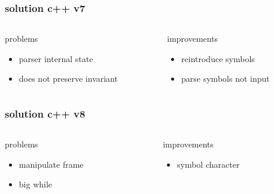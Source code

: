 \begin{frame}
    \frametitle{solution c++ v7}
    \begin{columns}
        \begin{column}{.48\textwidth}
            problems
            \begin{itemize}
                \item parser internal state
                \item does not preserve invariant
            \end{itemize}
        \end{column}
        \begin{column}{.48\textwidth}
            improvements
            \begin{itemize}
                \item reintroduce symbols
                \item parse symbols not input
            \end{itemize}
        \end{column}
    \end{columns}
\end{frame}

\begin{frame}
    \frametitle{solution c++ v8}
    \begin{columns}
        \begin{column}{.48\textwidth}
            problems
            \begin{itemize}
                \item manipulate frame
                \item big while
            \end{itemize}
        \end{column}
        \begin{column}{.48\textwidth}
            improvements
            \begin{itemize}
                \item symbol character
            \end{itemize}
        \end{column}
    \end{columns}
\end{frame}

